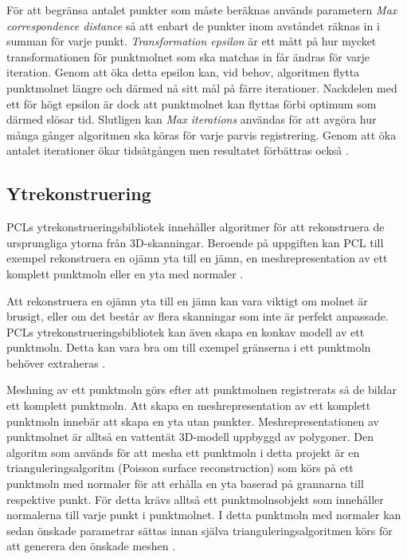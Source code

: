 För att begränsa antalet punkter som måste beräknas används parametern \textit{Max correspondence distance} så att enbart de punkter inom avståndet räknas in i summan för varje punkt. \textit{Transformation epsilon} är ett mått på hur mycket transformationen för punktmolnet som ska matchas in får ändras för varje iteration. Genom att öka detta epsilon kan, vid behov, algoritmen flytta punktmolnet längre och därmed nå sitt mål på färre iterationer. Nackdelen med ett för högt epsilon är dock att punktmolnet kan flyttas förbi optimum som därmed slösar tid. Slutligen kan \textit{Max iterations} användas för att avgöra hur många gånger algoritmen ska köras för varje parvis registrering. Genom att öka antalet iterationer ökar tidsåtgången men resultatet förbättras också \cite{pcl_icp_docs}.

\subsection{Ytrekonstruering}
PCLs ytrekonstrueringsbibliotek innehåller algoritmer för att rekonstruera de ursprungliga ytorna från 3D-skanningar. Beroende på uppgiften kan PCL till exempel rekonstruera en ojämn yta till en jämn, en meshrepresentation av ett komplett punktmoln eller en yta med normaler \cite{pcl_surface_reconstruction}.

Att rekonstruera en ojämn yta till en jämn kan vara viktigt om molnet är brusigt, eller om det består av flera skanningar som inte är perfekt anpassade. PCLs ytrekonstrueringsbibliotek kan även skapa en konkav modell av ett punktmoln. Detta kan vara bra om till exempel gränserna i ett punktmoln behöver extraheras \cite{pcl_surface_reconstruction}.

Meshning av ett punktmoln görs efter att punktmolnen registrerats så de bildar ett komplett punktmoln. Att skapa en meshrepresentation av ett komplett punktmoln innebär att skapa en yta utan punkter. Meshrepresentationen av punktmolnet är alltså en vattentät 3D-modell uppbyggd av polygoner. Den algoritm som används för att mesha ett punktmoln i detta projekt är en trianguleringsalgoritm (Poisson surface reconstruction) som körs på ett punktmoln med normaler för att erhålla en yta baserad på grannarna till respektive punkt. För detta krävs alltså ett punktmolnsobjekt som innehåller normalerna till varje punkt i punktmolnet. I detta punktmoln med normaler kan sedan önskade parametrar sättas innan själva trianguleringsalgoritmen körs för att generera den önskade meshen \cite{pcl_surface_reconstruction}\cite{pcl_triangulation_algorithm}. 


